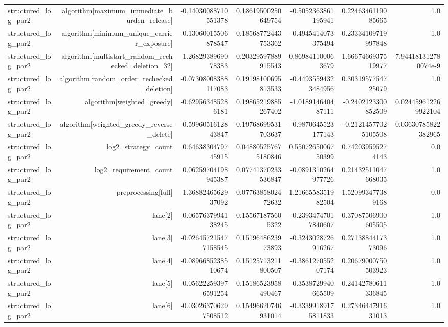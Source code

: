 {\begin{longtable}{lrrrrrr}
structured\_log\_par2 & algorithm[maximum\_immediate\_burden\_release] & -0.14030088710551378 & 0.18619500250649754 & -0.5052363861195941 & 0.2246346119085665 & 1.0 \\
structured\_log\_par2 & algorithm[minimum\_unique\_carrier\_exposure] & -0.13060015506878547 & 0.18568772443753362 & -0.4945414073375494 & 0.23334109719997848 & 1.0 \\
structured\_log\_par2 & algorithm[multistart\_random\_rechecked\_deletion\_32] & 1.2682938969078383 & 0.20329597889915543 & 0.869841100063679 & 1.6667466937519977 & 7.944181312780074e-9 \\
structured\_log\_par2 & algorithm[random\_order\_rechecked\_deletion] & -0.07308008388117083 & 0.19198100695813533 & -0.44935594323484956 & 0.3031957754725079 & 1.0 \\
structured\_log\_par2 & algorithm[weighted\_greedy] & -0.629563485286181 & 0.19865219885267402 & -1.018914640487111 & -0.2402123300852509 & 0.024459612269922104 \\
structured\_log\_par2 & algorithm[weighted\_greedy\_reverse\_delete] & -0.5996051612843847 & 0.19768699531703637 & -0.9870645523177143 & -0.21214577025105508 & 0.03630785822382965 \\
structured\_log\_par2 & log2\_strategy\_count & 0.6463830479745915 & 0.048805257675180846 & 0.5507265006750399 & 0.742039595274143 & 0.0 \\
structured\_log\_par2 & log2\_requirement\_count & 0.06259704198945387 & 0.07741370233536847 & -0.0891310264977726 & 0.21432511047668035 & 1.0 \\
structured\_log\_par2 & preprocessing[full] & 1.3688246562937092 & 0.0776385802472632 & 1.2166558351982504 & 1.520993477389168 & 0.0 \\
structured\_log\_par2 & lane[2] & 0.0657637994138245 & 0.155671875605322 & -0.23934747017840607 & 0.37087506900605505 & 1.0 \\
structured\_log\_par2 & lane[3] & -0.026457215477158545 & 0.1519648623973893 & -0.3243028726916267 & 0.2713884417373096 & 1.0 \\
structured\_log\_par2 & lane[4] & -0.0896685238510674 & 0.15125713211800507 & -0.386127055207174 & 0.20679000750503923 & 1.0 \\
structured\_log\_par2 & lane[5] & -0.056222593976591254 & 0.15186523958490467 & -0.3538729940665509 & 0.24142780611336845 & 1.0 \\
structured\_log\_par2 & lane[6] & -0.030263706297508512 & 0.15496620746931014 & -0.33399189175811833 & 0.2734644791631013 & 1.0 \\

\end{longtable}}
